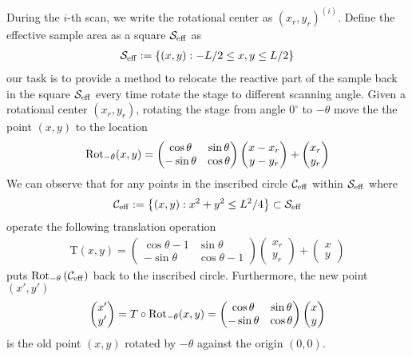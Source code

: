 \documentclass[letter, 10pt]{article}
\numberwithin{equation}{section}
\newcommand{\vsni}{\vspace{.1in} \noindent}
\newcommand{\mr}{\mathrm}
\newcommand{\set}[1]{\left\{ #1 \right\}}
\newcommand{\paren}[1]{ \left( #1 \right) }
\newcommand{\1}{\mathbf 1}
\begin{document}
\vsni During the $i$-th scan, we write the rotational center as $(x_r,y_r)^{(i)}$. Define the effective sample area as a square $\effarea$ as
\begin{align}
	\effarea :=\set{(x,y): -L/2\leq x,y\leq L/2}
\end{align}
our task is to provide a method to relocate the reactive part of the sample back in the square $\effarea$ every time rotate the stage  to  different scanning angle. Given a  rotational center $(x_r,y_r)$, rotating the stage from angle $0^\circ$ to $-\theta$ move the the point $(x,y)$ to the location
\begin{align}
	\rotation_{-\theta}(x,y) = \begin{pmatrix}
		\cos\theta & \sin\theta \\ -\sin\theta &\cos\theta
	\end{pmatrix}\begin{pmatrix}
		x - x_r \\ y-y_r
	\end{pmatrix} + \begin{pmatrix}
		x_r\\ y_r
	\end{pmatrix}
\end{align} 
We can observe that for any points in the inscribed circle $\effcirc$ within $\effarea$ where
\begin{align}
	\effcirc:=\set{(x,y):x^2 + y^2 \leq L^2/4 } \subset\effarea
\end{align}
operate the following translation operation
\begin{align}
	\mr T(x,y) =  \begin{pmatrix}
		\cos\theta-1 &\sin\theta \\ -\sin\theta & \cos\theta-1
	\end{pmatrix}\begin{pmatrix}
	x_r \\ y_r
	\end{pmatrix} + \begin{pmatrix}
		x \\ y
	\end{pmatrix}
\end{align}
puts $\rotation_{-\theta}\paren{\effcirc}$ back to the inscribed circle. Furthermore, the new point $(x',y')$
\begin{align}
	\begin{pmatrix}
		x'\\ y'
	\end{pmatrix} =  T\circ\rotation_{-\theta}(x,y) = \begin{pmatrix}
		\cos\theta & \sin\theta \\ -\sin\theta &\cos\theta
	\end{pmatrix}\begin{pmatrix}
		x  \\ y
	\end{pmatrix} 
\end{align}
is the old point $(x,y)$ rotated by $-\theta$ against the origin $(0,0)$. 
\end{document}
